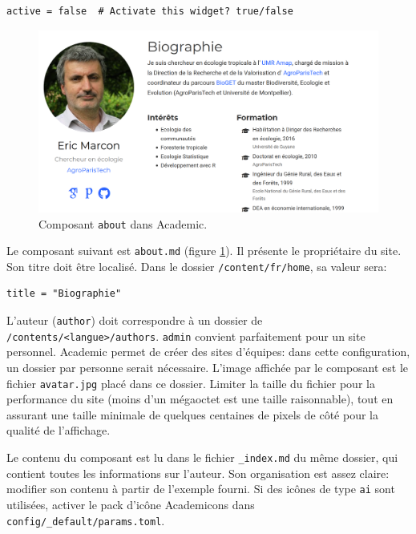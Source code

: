 \documentclass[
  12pt,
  french,
  a4paper,
  extrafontsizes,onecolumn,openright
  ]{memoir}
\newlength{\rf}
\begin{document}
\begin{verbatim}
active = false  # Activate this widget? true/false
\end{verbatim}



\scriptsize

\begin{figure}

{\centering \includegraphics[width=0.8\linewidth]{images/rediger-about} 

}

\caption{Composant \texttt{about} dans Academic.}\label{fig:rediger-about}
\end{figure}

\normalsize

Le composant suivant est \texttt{about.md} (figure \ref{fig:rediger-about}).
Il présente le propriétaire du site.
Son titre doit être localisé.
Dans le dossier \texttt{/content/fr/home}, sa valeur sera:

\begin{verbatim}
title = "Biographie"
\end{verbatim}

L'auteur (\texttt{author}) doit correspondre à un dossier de \texttt{/contents/\textless{}langue\textgreater{}}\break\texttt{/authors}.
\texttt{admin} convient parfaitement pour un site personnel.
Academic permet de créer des sites d'équipes: dans cette configuration, un dossier par personne serait nécessaire.
L'image affichée par le composant est le fichier \texttt{avatar.jpg} placé dans ce dossier.
Limiter la taille du fichier pour la performance du site (moins d'un mégaoctet est une taille raisonnable), tout en assurant une taille minimale de quelques centaines de pixels de côté pour la qualité de l'affichage.

Le contenu du composant est lu dans le fichier \texttt{\_index.md} du même dossier, qui contient toutes les informations sur l'auteur.
Son organisation est assez claire: modifier son contenu à partir de l'exemple fourni.
Si des icônes de type \texttt{ai} sont utilisées, activer le pack d'icône Academicons dans \texttt{config/\_default/params.toml}.
\end{document}
